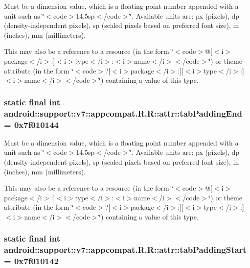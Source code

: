 Must be a dimension value, which is a floating point number appended with a unit such as \char`\"{}$<$code$>$14.5sp$<$/code$>$\char`\"{}. Available units are: px (pixels), dp (density-independent pixels), sp (scaled pixels based on preferred font size), in (inches), mm (millimeters). 

This may also be a reference to a resource (in the form \char`\"{}$<$code$>$@\mbox{[}$<$i$>$package$<$/i$>$:\mbox{]}$<$i$>$type$<$/i$>$:$<$i$>$name$<$/i$>$$<$/code$>$\char`\"{}) or theme attribute (in the form \char`\"{}$<$code$>$?\mbox{[}$<$i$>$package$<$/i$>$:\mbox{]}\mbox{[}$<$i$>$type$<$/i$>$:\mbox{]}$<$i$>$name$<$/i$>$$<$/code$>$\char`\"{}) containing a value of this type. \hypertarget{classandroid_1_1support_1_1v7_1_1appcompat_1_1_r_1_1attr_b08d3c84ee4c7a636b0dc662be161f46}{
\subsubsection[{tabPaddingEnd}]{\setlength{\rightskip}{0pt plus 5cm}static final int android::support::v7::appcompat.R.R::attr::tabPaddingEnd = 0x7f010144}}
\label{classandroid_1_1support_1_1v7_1_1appcompat_1_1_r_1_1attr_b08d3c84ee4c7a636b0dc662be161f46}


Must be a dimension value, which is a floating point number appended with a unit such as \char`\"{}$<$code$>$14.5sp$<$/code$>$\char`\"{}. Available units are: px (pixels), dp (density-independent pixels), sp (scaled pixels based on preferred font size), in (inches), mm (millimeters). 

This may also be a reference to a resource (in the form \char`\"{}$<$code$>$@\mbox{[}$<$i$>$package$<$/i$>$:\mbox{]}$<$i$>$type$<$/i$>$:$<$i$>$name$<$/i$>$$<$/code$>$\char`\"{}) or theme attribute (in the form \char`\"{}$<$code$>$?\mbox{[}$<$i$>$package$<$/i$>$:\mbox{]}\mbox{[}$<$i$>$type$<$/i$>$:\mbox{]}$<$i$>$name$<$/i$>$$<$/code$>$\char`\"{}) containing a value of this type. \hypertarget{classandroid_1_1support_1_1v7_1_1appcompat_1_1_r_1_1attr_64f2850e3b1f3f883ecb4d24cc98ead0}{
\subsubsection[{tabPaddingStart}]{\setlength{\rightskip}{0pt plus 5cm}static final int android::support::v7::appcompat.R.R::attr::tabPaddingStart = 0x7f010142}}
\label{classandroid_1_1support_1_1v7_1_1appcompat_1_1_r_1_1attr_64f2850e3b1f3f883ecb4d24cc98ead0}


